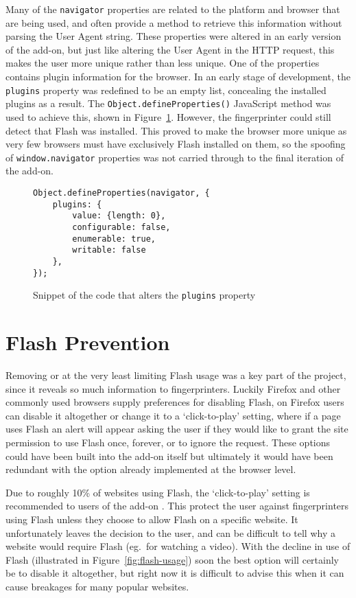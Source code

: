 Many of the \texttt{navigator} properties are related to the platform and browser that are being used, and often provide a method to retrieve this information without parsing the User Agent string.
These properties were altered in an early version of the add-on, but just like altering the User Agent in the HTTP request, this makes the user more unique rather than less unique.
One of the properties contains plugin information for the browser.
In an early stage of development, the \texttt{plugins} property was redefined to be an empty list, concealing the installed plugins as a result.
The \texttt{Object.defineProperties()} JavaScript method was used to achieve this, shown in Figure~\ref{lst:plugins}.
However, the fingerprinter could still detect that Flash was installed.
This proved to make the browser more unique as very few browsers must have exclusively Flash installed on them, so the spoofing of \texttt{window.navigator} properties was not carried through to the final iteration of the add-on.

\begin{figure}[h!]
\begin{lstlisting}
Object.defineProperties(navigator, {
    plugins: {
        value: {length: 0},
        configurable: false,
        enumerable: true,
        writable: false
    },
});
\end{lstlisting}
\caption{Snippet of the code that alters the \texttt{plugins} property}
\label{lst:plugins}
\end{figure}

\section{Flash Prevention}

Removing or at the very least limiting Flash usage was a key part of the project, since it reveals so much information to fingerprinters.
Luckily Firefox and other commonly used browsers supply preferences for disabling Flash, on Firefox users can disable it altogether or change it to a `click-to-play' setting, where if a page uses Flash an alert will appear asking the user if they would like to grant the site permission to use Flash once, forever, or to ignore the request.
These options could have been built into the add-on itself but ultimately it would have been redundant with the option already implemented at the browser level.

Due to roughly 10\% of websites using Flash, the `click-to-play' setting is recommended to users of the add-on \citep{flash-usage}.
This protect the user against fingerprinters using Flash unless they choose to allow Flash on a specific website.
It unfortunately leaves the decision to the user, and can be difficult to tell why a website would require Flash (eg.\ for watching a video).
With the decline in use of Flash (illustrated in Figure~\ref{fig:flash-usage}) soon the best option will certainly be to disable it altogether, but right now it is difficult to advise this when it can cause breakages for many popular websites.

